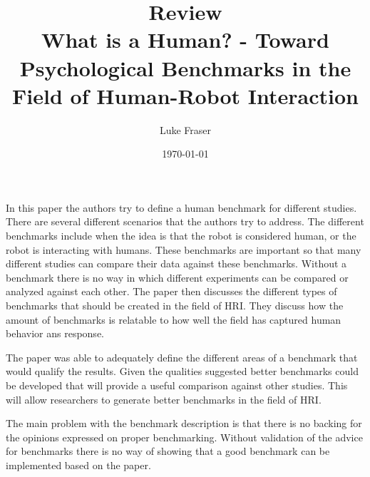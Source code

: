 \documentclass{article}
\begin{document}
\title{{\large Review} \\ What is a Human? - Toward Psychological Benchmarks in the Field of Human-Robot Interaction}
\author{Luke Fraser}
\date{\today}
\maketitle

\begingroup
\renewcommand{\section}[2]{}


\endgroup

\section*{Summary}
In this paper the authors try to define a human benchmark for different studies. There are several different scenarios that the authors try to address. The different benchmarks include when the idea is that the robot is considered human, or the robot is interacting with humans. These benchmarks are important so that many different studies can compare their data against these benchmarks. Without a benchmark there is no way in which different experiments can be compared or analyzed against each other. The paper then discusses the different types of benchmarks that should be created in the field of HRI. They discuss how the amount of benchmarks is relatable to how well the field has captured human behavior ans response.
\section*{Strengths}
The paper was able to adequately define the different areas of a benchmark that would qualify the results. Given the qualities suggested better benchmarks could be developed that will provide a useful comparison against other studies. This will allow researchers to generate better benchmarks in the field of HRI.
\section*{Critique}
The main problem with the benchmark description is that there is no backing for the opinions expressed on proper benchmarking. Without validation of the advice for benchmarks there is no way of showing that a good benchmark can be implemented based on the paper.
\cite{4107835}
\end{document}
